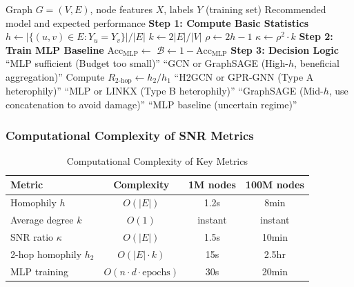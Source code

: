 \begin{algorithm}[t]
\caption{SNR-Based GNN Model Selection}
\label{alg:snr_model_selection}
\begin{algorithmic}[1]
\Require Graph $G = (V, E)$, node features $X$, labels $Y$ (training set)
\Ensure Recommended model and expected performance
\State \textbf{Step 1: Compute Basic Statistics}
\State $h \gets |\{(u,v) \in E : Y_u = Y_v\}| / |E|$ 
\State $k \gets 2|E| / |V|$ 
\State $\rho \gets 2h - 1$ 
\State $\kappa \gets \rho^2 \cdot k$ 
\State
\State \textbf{Step 2: Train MLP Baseline}
\State $\text{Acc}_{\text{MLP}} \gets$ 
\State $\mathcal{B} \gets 1 - \text{Acc}_{\text{MLP}}$ 
\State
\State \textbf{Step 3: Decision Logic}
    \State \Return ``MLP sufficient (Budget too small)''
    \State \Return ``GCN or GraphSAGE (High-$h$, beneficial aggregation)''
    \State Compute $R_{2\text{-hop}} \gets h_2 / h_1$
        \State \Return ``H2GCN or GPR-GNN (Type A heterophily)''
    \Else
        \State \Return ``MLP or LINKX (Type B heterophily)''
    \EndIf
{}
    \State \Return ``GraphSAGE (Mid-$h$, use concatenation to avoid damage)''
\Else
    \State \Return ``MLP baseline (uncertain regime)''
\EndIf
\end{algorithmic}
\end{algorithm}

\subsubsection{Computational Complexity of SNR Metrics}

\begin{table}[t]
\centering
\caption{Computational Complexity of Key Metrics}
\label{tab:complexity_metrics}
\small
\begin{tabular}{@{}lccc@{}}
\toprule
\textbf{Metric} & \textbf{Complexity} & \textbf{1M nodes} & \textbf{100M nodes} \\
\midrule
Homophily $h$ & $O(|E|)$ & 1.2s & 8min \\
Average degree $k$ & $O(1)$ & instant & instant \\
SNR ratio $\kappa$ & $O(|E|)$ & 1.5s & 10min \\
2-hop homophily $h_2$ & $O(|E| \cdot k)$ & 15s & 2.5hr \\
MLP training & $O(n \cdot d \cdot \text{epochs})$ & 30s & 20min \\
\bottomrule
\end{tabular}
\end{table}

